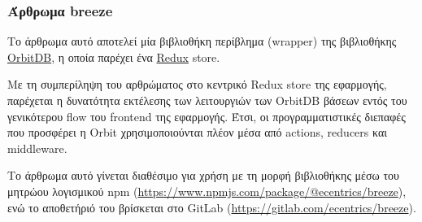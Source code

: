 \subsubsection{Άρθρωμα breeze} \label{subsubsection:4-3-1-eth-breeze-unit}

Το άρθρωμα αυτό αποτελεί μία βιβλιοθήκη περίβλημα (wrapper) της βιβλιοθήκης \hyperref[subsection:4-2-4-2-orbit-db]{OrbitDB}, η οποία παρέχει ένα \hyperref[subsection:4-2-2-1-redux]{Redux} store. 

Με τη συμπερίληψη του αρθρώματος στο κεντρικό Redux store της εφαρμογής, παρέχεται η δυνατότητα εκτέλεσης των λειτουργιών των OrbitDB βάσεων εντός του γενικότερου flow του frontend της εφαρμογής. Έτσι, οι προγραμματιστικές διεπαφές που προσφέρει η Orbit χρησιμοποιούνται πλέον μέσα από actions, reducers και middleware.

Το άρθρωμα αυτό γίνεται διαθέσιμο για χρήση με τη μορφή βιβλιοθήκης μέσω του μητρώου λογισμικού npm (\url{https://www.npmjs.com/package/@ecentrics/breeze}), ενώ το αποθετήριό του βρίσκεται στο GitLab (\url{https://gitlab.com/ecentrics/breeze}).
